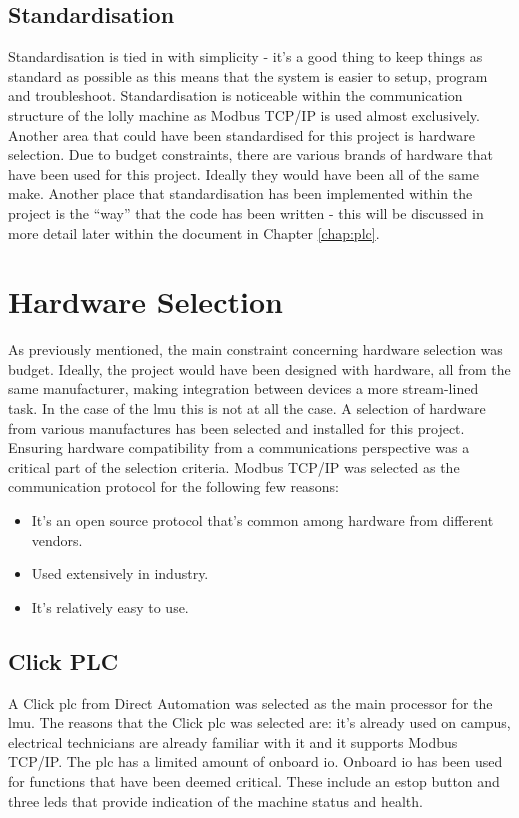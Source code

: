     \subsection{Standardisation}
        Standardisation is tied in with simplicity - it's a good thing to keep things as standard as possible as this means that the system is easier to setup, program and troubleshoot. Standardisation is noticeable within the communication structure of the lolly machine as Modbus TCP/IP is used almost exclusively. Another area that could have been standardised for this project is hardware selection. Due to budget constraints, there are various brands of hardware that have been used for this project. Ideally they would have been all of the same make. Another place that standardisation has been implemented within the project is the “way” that the code has been written - this will be discussed in more detail later within the document in Chapter \ref{chap:plc}.
    
    
        
    \section {Hardware Selection}
        As previously mentioned, the main constraint concerning hardware selection was budget. Ideally, the project would have been designed with hardware, all from the same manufacturer, making integration between devices a more stream-lined task. In the case of the \acrshort{lmu} this is not at all the case. A selection of hardware from various manufactures has been selected and installed for this project. Ensuring hardware compatibility from a communications perspective was a critical part of the selection criteria. Modbus TCP/IP was selected as the communication protocol for the following few reasons:
        \begin{itemize}[noitemsep]
            \item It's an open source protocol that's common among hardware from different vendors.
            \item Used extensively in industry.
            \item It's relatively easy to use.
        \end{itemize}
    
        
    
    \subsection{Click PLC}
        A Click \acrshort{plc} from Direct Automation was selected as the main processor for the \acrshort{lmu}. The reasons that the Click \acrshort{plc} was selected are: it's already used on campus, electrical technicians are already familiar with it and it supports Modbus TCP/IP. The \acrshort{plc} has a limited amount of onboard \acrshort{io}. Onboard \acrshort{io} has been used for functions that have been deemed critical. These include an \acrshort{estop} button and three \acrshort{led}s that provide indication of the machine status and health.
    
